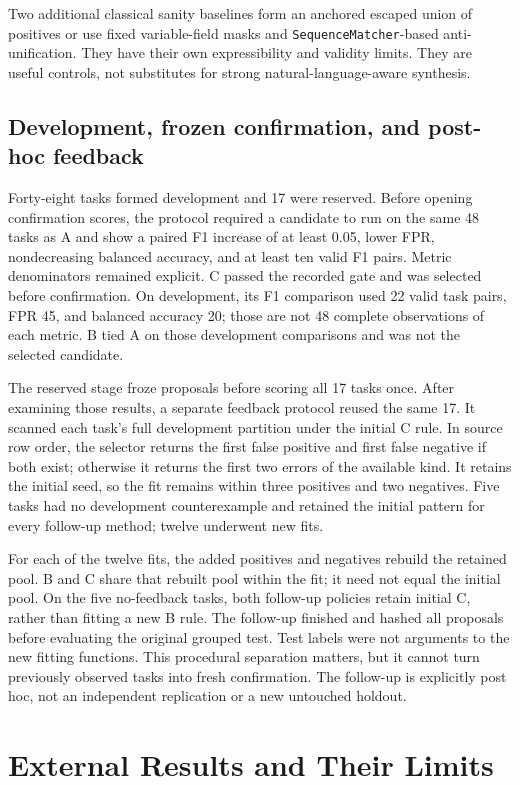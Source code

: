 \documentclass[10pt,twocolumn,letterpaper]{article}
\begin{document}
Two additional classical sanity baselines form an anchored escaped union of positives or use fixed variable-field masks and \texttt{SequenceMatcher}-based anti-unification. They have their own expressibility and validity limits. They are useful controls, not substitutes for strong natural-language-aware synthesis.

\subsection{Development, frozen confirmation, and post-hoc feedback}
Forty-eight tasks formed development and 17 were reserved. Before opening confirmation scores, the protocol required a candidate to run on the same 48 tasks as A and show a paired F1 increase of at least 0.05, lower FPR, nondecreasing balanced accuracy, and at least ten valid F1 pairs. Metric denominators remained explicit. C passed the recorded gate and was selected before confirmation. On development, its F1 comparison used 22 valid task pairs, FPR 45, and balanced accuracy 20; those are not 48 complete observations of each metric. B tied A on those development comparisons and was not the selected candidate.

The reserved stage froze proposals before scoring all 17 tasks once. After examining those results, a separate feedback protocol reused the same 17. It scanned each task's full development partition under the initial C rule. In source row order, the selector returns the first false positive and first false negative if both exist; otherwise it returns the first two errors of the available kind. It retains the initial seed, so the fit remains within three positives and two negatives. Five tasks had no development counterexample and retained the initial pattern for every follow-up method; twelve underwent new fits.

For each of the twelve fits, the added positives and negatives rebuild the retained pool. B and C share that rebuilt pool within the fit; it need not equal the initial pool. On the five no-feedback tasks, both follow-up policies retain initial C, rather than fitting a new B rule. The follow-up finished and hashed all proposals before evaluating the original grouped test. Test labels were not arguments to the new fitting functions. This procedural separation matters, but it cannot turn previously observed tasks into fresh confirmation. The follow-up is explicitly post hoc, not an independent replication or a new untouched holdout.

\section{External Results and Their Limits}
\label{sec:results}
\end{document}
